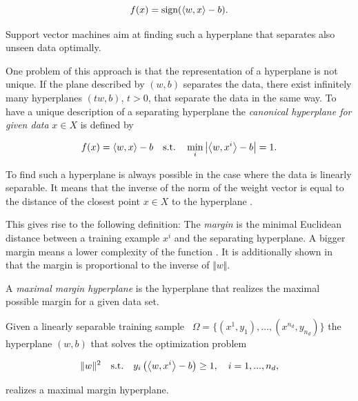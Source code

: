 \[ f(x) = \text{sign}(\left\langle w,x\right\rangle-b). \]

Support vector machines aim at finding such a hyperplane that separates also unseen data optimally.


One problem of this approach is that the representation of a hyperplane is not unique. If the plane described by \((w,b)\) separates the data, there exist infinitely many hyperplanes \((tw,b)\), \(t>0\), that separate the data in the same way.
To have a unique description of a separating hyperplane the \emph{canonical hyperplane for given data} \(x \in X\) is defined by
 
\[ f(x) = \left\langle w, x\right\rangle - b  \quad \text{s.t.} \quad \min_i \left\vert\left\langle w,x^i\right\rangle -b\right\vert = 1.\] 

To find such a hyperplane is always possible in the case where the data is  linearly separable. It means that the inverse of the norm of the weight vector is equal to the distance of the closest point \(x \in X \) to  the hyperplane \cite[p. 10]{Kunapuli2008}.



This gives rise to the following definition:
The \emph{margin} is the minimal Euclidean distance between a training example \(x^i\) and the separating hyperplane.
A bigger margin means a lower complexity of the function \cite{Cristianini2000}. It is additionally shown in \cite[p. 10]{Kunapuli2008} that the margin is proportional to the inverse of \(\Vert w \Vert\).

A \emph{maximal margin hyperplane} is the hyperplane that realizes the maximal possible margin for a given data set.

\begin{proposition}
Given a linearly separable training sample \ \(\Omega = \{(x^1,y_1),...,(x^{n_d},y_{n_d})\}\) the hyperplane \((w,b)\) that solves the optimization problem

\[\|w\|^2 \quad \text{s.t.} \quad y_i\left(\left\langle w,x^i\right\rangle-b\right)\geq 1, \quad i = 1,...,n_d, \]

realizes a maximal margin hyperplane.
\end{proposition}


